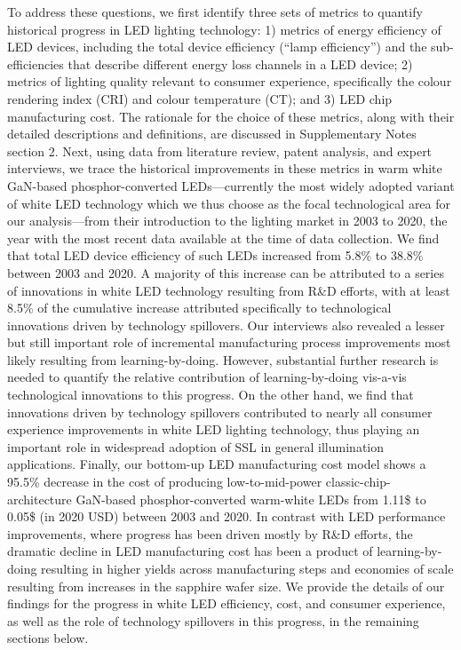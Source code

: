 \documentclass[parskip=full]{article}
\begin{document}
To address these questions, we first identify three sets of metrics to quantify historical progress in LED lighting technology: 1) metrics of energy efficiency of LED devices, including the total device efficiency (“lamp efficiency”) and the sub-efficiencies that describe different energy loss channels in a LED device; 2) metrics of lighting quality relevant to consumer experience, specifically the colour rendering index (CRI) and colour temperature (CT); and 3) LED chip manufacturing cost. The rationale for the choice of these metrics, along with their detailed descriptions and definitions, are discussed in Supplementary Notes section 2. Next, using data from literature review, patent analysis, and expert interviews, we trace the historical improvements in these metrics in warm white GaN-based phosphor-converted LEDs—currently the most widely adopted variant of white LED technology which we thus choose as the focal technological area for our analysis—from their introduction to the lighting market in 2003 to 2020, the year with the most recent data available at the time of data collection. We find that total LED device efficiency of such LEDs increased from 5.8\% to 38.8\% between 2003 and 2020. A majority of this increase can be attributed to a series of innovations in white LED technology resulting from R\&D efforts, with at least 8.5\% of the cumulative increase attributed specifically to technological innovations driven by technology spillovers. Our interviews also revealed a lesser but still important role of incremental manufacturing process improvements most likely resulting from learning-by-doing. However, substantial further research is needed to quantify the relative contribution of learning-by-doing vis-a-vis technological innovations to this progress. On the other hand, we find that innovations driven by technology spillovers contributed to nearly all consumer experience improvements in white LED lighting technology, thus playing an important role in widespread adoption of SSL in general illumination applications. Finally, our bottom-up LED manufacturing cost model shows a 95.5\% decrease in the cost of producing low-to-mid-power classic-chip-architecture GaN-based phosphor-converted warm-white LEDs from 1.11\$ to 0.05\$ (in 2020 USD) between 2003 and 2020. In contrast with LED performance improvements, where progress has been driven mostly by R\&D efforts, the dramatic decline in LED manufacturing cost has been a product of learning-by-doing resulting in higher yields across manufacturing steps and economies of scale resulting from increases in the sapphire wafer size. We provide the details of our findings for the progress in white LED efficiency, cost, and consumer experience, as well as the role of technology spillovers in this progress, in the remaining sections below. 
\end{document}

